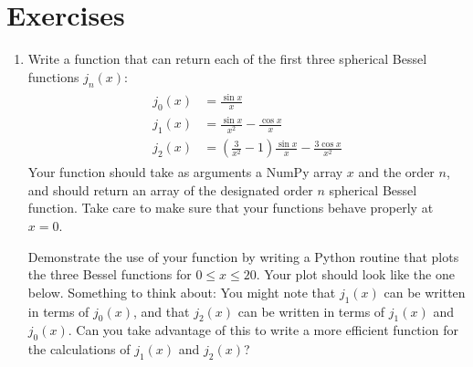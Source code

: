 \documentclass[letterpaper,10pt,english]{sphinxmanual}
\begin{document}
\section{Exercises}
\label{chap7/chap7_funcs:exercises}\begin{enumerate}
\item {} 
Write a function that can return each of the first three spherical Bessel functions \(j_n(x)\):
\label{chap7/chap7_funcs:equation-eq:bessel}\begin{gather}
\begin{split}j_0(x) &= \frac{\sin x}{x}\\
j_1(x) &= \frac{\sin x}{x^2} - \frac{\cos x}{x}\\
j_2(x) &= \left(\frac{3}{x^2}-1\right)\frac{\sin x}{x} - \frac{3\cos x}{x^2}\end{split}\label{chap7/chap7_funcs-eq:bessel}
\end{gather}
Your function should take as arguments a NumPy array \(x\) and the order \(n\), and should return an array of the designated order \(n\) spherical Bessel function.  Take care to make sure that your functions behave properly at \(x=0\).

Demonstrate the use of your function by writing a Python routine that plots the three Bessel functions for \(0 \le x \le 20\).  Your plot should look like the one below.  Something to think about: You might note that \(j_1(x)\) can be written in terms of \(j_0(x)\), and that \(j_2(x)\) can be written in terms of \(j_1(x)\) and \(j_0(x)\).  Can you take advantage of this to write a more efficient function for the calculations of \(j_1(x)\) and \(j_2(x)\)?
\begin{figure}[htbp]
\centering

\label{chap7/chap7_funcs:fig-besselsph}\end{figure}


\end{enumerate}
\end{document}

